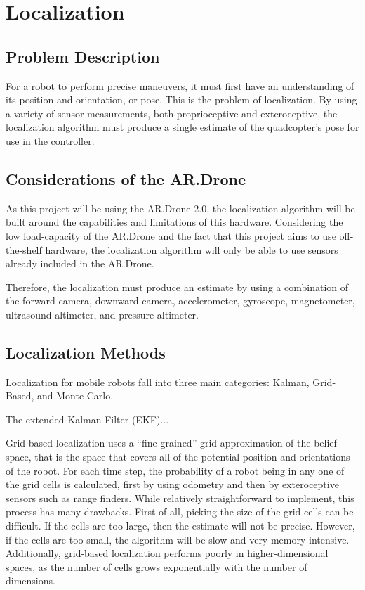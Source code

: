 
\chapter{Localization\label{ch:localization}}

\section{Problem Description}
For a robot to perform precise maneuvers, it must first have an understanding of its position and orientation, or pose. This is the problem of localization. By using a variety of sensor measurements, both proprioceptive and exteroceptive, the localization algorithm must produce a single estimate of the quadcopter's pose for use in the controller.

\section{Considerations of the AR.Drone}

As this project will be using the AR.Drone 2.0, the localization algorithm will be built around the capabilities and limitations of this hardware. Considering the low load-capacity of the AR.Drone and the fact that this project aims to use off-the-shelf hardware, the localization algorithm will only be able to use sensors already included in the AR.Drone.

Therefore, the localization must produce an estimate by using a combination of the forward camera, downward camera, accelerometer, gyroscope, magnetometer, ultrasound altimeter, and pressure altimeter. 

\section{Localization Methods}

Localization for mobile robots fall into three main categories: Kalman, Grid-Based, and Monte Carlo.

The extended Kalman Filter (EKF)... 

Grid-based localization uses a ``fine grained'' grid approximation of the belief space, that is the space that covers all of the potential position and orientations of the robot.\cite{Fox} For each time step, the probability of a robot being in any one of the grid cells is calculated, first by using odometry and then by exteroceptive sensors such as range finders. While relatively straightforward to implement, this process has many drawbacks. First of all, picking the size of the grid cells can be difficult. If the cells are too large, then the estimate will not be precise. However, if the cells are too small, the algorithm will be slow and very memory-intensive. Additionally, grid-based localization performs poorly in higher-dimensional spaces, as the number of cells grows exponentially with the number of dimensions.


